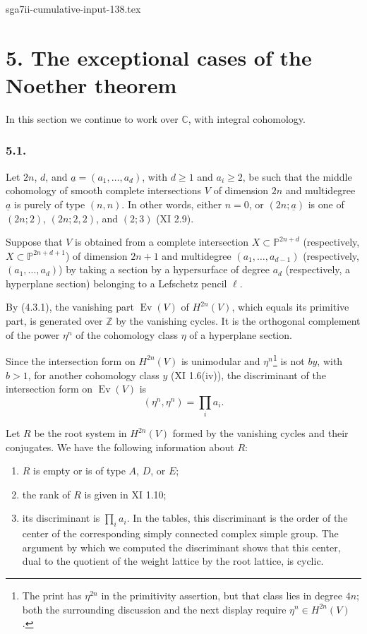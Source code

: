 \begin{filecontents*}{sga7ii-cumulative-input-138.tex}
\section*{5. The exceptional cases of the Noether theorem}

In this section we continue to work over $\mathbb C$, with integral
cohomology.

\subsubsection*{5.1.}
Let $2n$, $d$, and $\underline a=(a_1,\ldots,a_d)$, with $d\geq1$ and
$a_i\geq2$, be such that the middle cohomology of smooth complete
intersections $V$ of dimension $2n$ and multidegree $\underline a$ is
purely of type $(n,n)$.  In other words, either $n=0$, or
$(2n;\underline a)$ is one of $(2n;2)$, $(2n;2,2)$, and $(2;3)$
(XI 2.9).

Suppose that $V$ is obtained from a complete intersection
$X\subset\mathbb P^{2n+d}$ (respectively,
$X\subset\mathbb P^{2n+d+1}$) of dimension $2n+1$ and multidegree
$(a_1,\ldots,a_{d-1})$ (respectively, $(a_1,\ldots,a_d)$) by taking a
section by a hypersurface of degree $a_d$ (respectively, a hyperplane
section) belonging to a Lefschetz pencil $\ell$.

By (4.3.1), the vanishing part $\operatorname{Ev}(V)$ of $H^{2n}(V)$,
which equals its primitive part, is generated over $\mathbb Z$ by the
vanishing cycles.  It is the orthogonal complement of the power $\eta^n$
of the cohomology class $\eta$ of a hyperplane section.

Since the intersection form on $H^{2n}(V)$ is unimodular and
$\eta^n$\footnote{The print has $\eta^{2n}$ in the primitivity assertion,
but that class lies in degree $4n$; both the surrounding discussion and the
next display require $\eta^n\in H^{2n}(V)$.} is not $b y$, with $b>1$, for
another cohomology class $y$ (XI 1.6(iv)), the
discriminant of the intersection form on $\operatorname{Ev}(V)$ is
\[
 (\eta^n,\eta^n)=\prod_i a_i.
\]

Let $R$ be the root system in $H^{2n}(V)$ formed by the vanishing cycles
and their conjugates.  We have the following information about $R$:
\begin{enumerate}[label=(\alph*)]
\item $R$ is empty or is of type $A$, $D$, or $E$;
\item the rank of $R$ is given in XI 1.10;
\item its discriminant is $\prod_i a_i$.  In the tables, this discriminant
  is the order of the center of the corresponding simply connected complex
  simple group.  The argument by which we computed the discriminant shows
  that this center, dual to the quotient of the weight lattice by the root
  lattice, is cyclic.
\end{enumerate}


\end{filecontents*}
